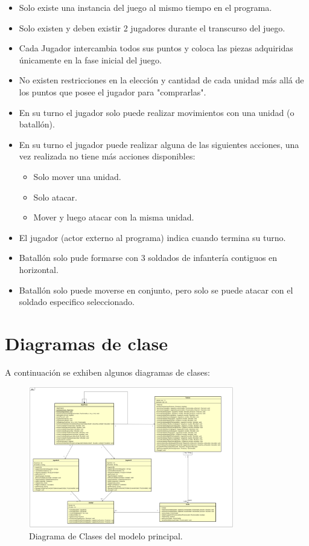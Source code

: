 \documentclass[titlepage,a4paper]{article}
\begin{document}
\begin{itemize}
\item Solo existe una instancia del juego al mismo tiempo en el programa.
\item Solo existen y deben existir 2 jugadores durante el transcurso del juego.
\item Cada Jugador intercambia todos sus puntos y coloca las piezas adquiridas únicamente en la fase inicial del juego.
\item No existen restricciones en la elección y cantidad de cada unidad más allá de los puntos que posee el jugador para "comprarlas".
\item En su turno el jugador solo puede realizar movimientos con una unidad (o batallón).
\item En su turno el jugador puede realizar alguna de las siguientes acciones, una vez realizada no tiene más acciones disponibles: 
\begin{itemize}
\item Solo mover una unidad.
\item Solo atacar.
\item Mover y luego atacar con la misma unidad.
\end{itemize}
\item El jugador (actor externo al programa) indica cuando termina su turno.
\item Batallón solo pude formarse con 3 soldados de infantería contiguos en horizontal.
\item Batallón solo puede moverse en conjunto, pero solo se puede atacar con el soldado especifico seleccionado. 
\end{itemize}

\section{Diagramas de clase}\label{sec:diagramasdeclase}
A continuación se exhiben algunos diagramas de clases:


\begin{figure}[H]
\centering
\includegraphics[width=0.8\textwidth]{DiagramasDeSecuencia/DiagramaDeClasesPrincipalModelo.png}
\caption{\label{fig:class01q}Diagrama de Clases del modelo principal.}
\end{figure}
 
\end{document}
